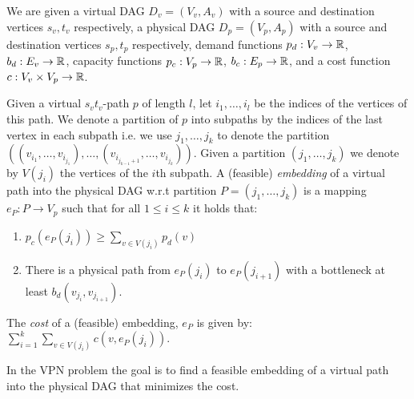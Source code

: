 We are given a virtual DAG $D_v = (V_v, A_v)$ 
with a source and destination vertices $s_v, t_v$ respectively, 
a physical DAG $D_p = (V_p, A_p)$
with a source and destination vertices $s_p, t_p$ respectively,
demand functions $p_d : V_v \to \mathbb{R}$, $b_d : E_v \to \mathbb{R}$,
capacity functions $p_c : V_p \to \mathbb{R}$, $b_c : E_p \to \mathbb{R}$,
and a cost function $c: V_v \times V_p \to \mathbb{R}$. 

Given a virtual $s_vt_v$-path $p$ of length $l$,
let $i_1, \ldots, i_l$ be the indices of the vertices of this path.
We denote a partition of $p$ into subpaths by the indices of the last vertex in
each subpath i.e. we use $j_1, \ldots, j_k$ to denote the partition 
$((v_{i_1}, \ldots, v_{i_{j_1}}), \ldots, (v_{i_{j_{k-1} + 1}}, \ldots,
v_{i_{j_k}}))$.
Given a partition $(j_1, \ldots, j_k)$ we denote by $V(j_i)$ the vertices of the
$i$th subpath.
A (feasible) \emph{embedding} of a virtual path into the physical DAG 
w.r.t partition $P = (j_1, \ldots,j_k)$ is a mapping $e_P : P \to V_p$ such that
for all $1 \leq i \leq k$ it holds that:
\begin{enumerate}
  \item $p_c(e_P(j_i)) \geq \sum_{v \in V(j_i)} p_d(v)$
  \item There is a physical path from $e_P(j_i)$ to $e_P(j_{i+1})$ with a
  bottleneck at least $b_d(v_{j_i}, v_{j_{i+1}})$.
\end{enumerate}
The \emph{cost} of a (feasible) embedding, $e_P$ is given by:
$\sum_{i = 1}^k \sum_{v \in V(j_i)} c(v, e_P(j_i))$.   

In the  VPN problem the goal is to find a
feasible embedding of a virtual path into the physical DAG that minimizes the
cost.

\begin{figure}[ht]
\centering
\scalebox{1}{

}

\end{figure}
